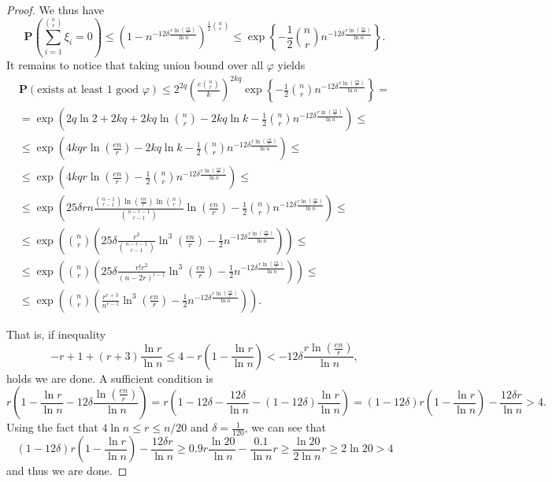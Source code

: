 \documentclass[12pt]{article}
\theoremstyle{remark}
\theoremstyle{definition}
\newcommand{\mP}{\mathbf{P}}
\newcommand{\skob}[1]{\left(#1\right)}
\begin{document}
\begin{proof}
    	We thus have
	$$
         		\mP\skob{\sum_{i = 1}^{\binom{n}{r}}\xi_i = 0} \leq \skob{1 - n^{-12\delta\frac{ r\ln\skob{\frac{en}{r}}}{\ln n}}}^{\frac{1}{2}\binom{n}{r}} \leq \exp\left\{-\frac{1}{2}\binom{n}{r}n^{-12\delta\frac{r\ln\skob{\frac{en}{r}}}{\ln n}}\right\}.
	$$
	It remains to notice that taking union bound over all $\varphi$ yields 
	\begin{multline*}
		\mP(\text{exists at least } 1 \text{ good } \varphi) \leq 2^{2q}\skob{\frac{e\binom{n}{r}}{k}}^{2kq}\exp\left\{-\frac{1}{2}\binom{n}{r}n^{-12\delta\frac{r\ln\skob{\frac{en}{r}}}{\ln n}}\right\} = \\ 
		= \exp\skob{2q\ln 2 + 2kq + 2kq\ln\binom{n}{r} - 2kq\ln k - \frac12\binom{n}{r}n^{-12\delta\frac{r\ln\skob{\frac{en}{r}}}{\ln n}}} \leq \\
		\leq \exp\skob{4kqr\ln\skob{\frac{en}{r}} - 2kq\ln k - \frac12\binom{n}{r}n^{-12\delta\frac{r\ln\skob{\frac{en}{r}}}{\ln n}}} \leq \\ 
		\leq \exp\skob{4kqr\ln\skob{\frac{en}{r}} - \frac12\binom{n}{r}n^{-12\delta\frac{r\ln\skob{\frac{en}{r}}}{\ln n}}} \leq \\
		\leq  \exp\skob{25\delta rn\frac{\binom{n-1}{r-1}\ln\skob{\frac{en}{r}}\ln \binom{n}{r}}{\binom{n-r-1}{r-1}}\ln\skob{\frac{en}{r}} - \frac12\binom{n}{r}n^{-12\delta\frac{r\ln\skob{\frac{en}{r}}}{\ln n}}} \leq \\
		\leq  \exp\skob{\binom{n}{r}\skob{25\delta \frac{r^3}{\binom{n-r-1}{r-1}}\ln^3\skob{\frac{en}{r}} - \frac12n^{-12\delta\frac{r\ln\skob{\frac{en}{r}}}{\ln n}}}} \leq \\
		\leq  \exp\skob{\binom{n}{r}\skob{25\delta \frac{r!r^2}{(n-2r)^{r-1}}\ln^3\skob{\frac{en}{r}} - \frac12n^{-12\delta\frac{r\ln\skob{\frac{en}{r}}}{\ln n}}}} \leq \\ 
		\leq  \exp\skob{\binom{n}{r}\skob{\frac{r^{r+3}}{n^{r-1}}\ln^3\skob{\frac{en}{r}} - \frac12n^{-12\delta\frac{r\ln\skob{\frac{en}{r}}}{\ln n}}}}.
    \end{multline*}
   
	That is, if inequality 
	$$
		-r+1+(r+3)\frac{\ln r}{\ln n} \leq 4 - r\skob{1-\frac{\ln r}{\ln n}} < -12\delta\frac{r\ln\skob{\frac{en}{r}}}{\ln n},
	$$
	holds we are done. A sufficient condition is
	$$
		r\skob{1-\frac{\ln r}{\ln n}-12\delta\frac{\ln\skob{\frac{en}{r}}}{\ln n}} = r\skob{1-12\delta-\frac{12\delta}{\ln n} - (1-12\delta)\frac{\ln r}{\ln n}} = (1-12\delta)r\skob{1 - \frac{\ln r}{\ln n}} - \frac{12\delta r}{\ln n} > 4.
	$$
	Using the fact that $4\ln n \leq r \leq n/20$ and $\delta = \frac{1}{120}$, we can see that
	$$
 		 (1-12\delta)r\skob{1 - \frac{\ln r}{\ln n}} - \frac{12\delta r}{\ln n} \geq 0.9r\frac{\ln 20}{\ln n} - \frac{0.1}{\ln n}r \geq \frac{\ln 20}{2\ln n}r \geq 2\ln 20 > 4
	$$ 
	and thus we are done.
\end{proof}
\end{document}
